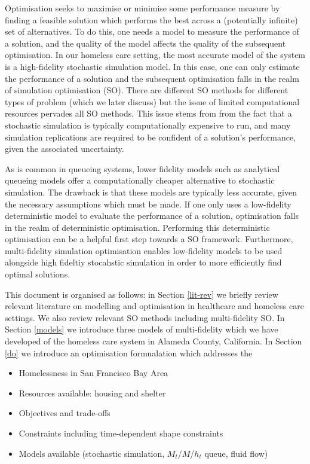 \documentclass{article}
\begin{document}
Optimisation seeks to maximise or minimise some performance measure by finding a feasible solution which performs the best across a (potentially infinite) set of alternatives. To do this, one needs a model to measure the performance of a solution, and the quality of the model affects the quality of the subsequent optimisation. In our homeless care setting, the most accurate model of the system is a high-fidelity stochastic simulation model. In this case, one can only estimate the performance of a solution and the subsequent optimisation falls in the realm of simulation optimisation (SO). There are different SO methods for different types of problem (which we later discuss) but the issue of limited computational resources pervades all SO methods. This issue stems from from the fact that a stochastic simulation is typically computationally expensive to run, and many simulation replications are required to be confident of a solution's performance, given the associated uncertainty. \newline

As is common in queueing systems, lower fidelity models such as analytical queueing models offer a computationally cheaper alternative to stochastic simulation. The drawback is that these models are typically less accurate, given the necessary assumptions which must be made. If one only uses a low-fidelity deterministic model to evaluate the performance of a solution, optimisation falls in the realm of deterministic optimisation. Performing this deterministic optimisation can be a helpful first step towards a SO framework. Furthermore, multi-fidelity simulation optimisation enables low-fidelity models to be used alongside high fideltiy stocahstic simulation in order to more efficiently find optimal solutions. \newline

This document is organised as follows: in Section \ref{lit-rev} we briefly review relevant literature on modelling and optimisation in healthcare and homeless care settings. We also review relevant SO methods including multi-fidelity SO. In Section \ref{models} we introduce three models of multi-fidelity which we have developed of the homeless care system in Alameda County, California. In Section \ref{do} we introduce an optimisation formualation which addresses the 

\begin{itemize}[noitemsep]
\item Homelessness in San Francisco Bay Area
\item Resources available: housing and shelter
\item Objectives and trade-offs
\item Constraints including time-dependent shape constraints
\item Models available (stochastic simulation, $M_t$/$M$/$h_t$ queue, fluid flow)
\end{itemize}
\end{document}
